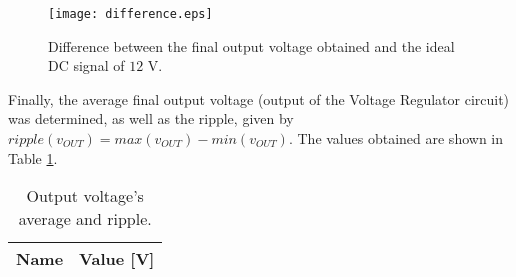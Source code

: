 \begin{figure}[H] \centering
  \texttt{[image: difference.eps]}
  \caption{Difference between the final output voltage obtained and the ideal DC signal of $12$ V.}
  \label{fig:difference_from_12V}
\end{figure}

Finally, the average final output voltage (output of the Voltage Regulator circuit) was determined, as well as the ripple, given by $ripple(v_{OUT})=max(v_{OUT})-min(v_{OUT})$. The values obtained are shown in Table \ref{tab:theoretical_finalvoltage_ripple}.

\begin{table}[H]
  \centering
  \begin{tabular}{|c|c|}
    \hline    
    {\bf Name} & {\bf Value [V]} \\ \hline
    
  \end{tabular}
  \caption{Output voltage's average and ripple.}
  \label{tab:theoretical_finalvoltage_ripple}
\end{table}
